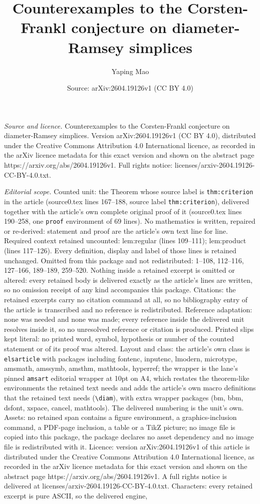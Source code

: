 \documentclass[10pt,a4paper]{amsart}
\title[Counterexamples to the Corsten-Frankl conjecture on diameter]{Counterexamples to the Corsten-Frankl conjecture on diameter-Ramsey simplices}
\author{Yaping Mao}
\date{Source: arXiv:2604.19126v1 (CC BY 4.0)}
\begin{document}
\maketitle

\noindent\emph{Source and licence.} Counterexamples to the Corsten-Frankl conjecture on diameter-Ramsey simplices. Version arXiv:2604.19126v1 (CC BY 4.0), distributed under the Creative Commons Attribution 4.0 International licence, as recorded in the arXiv licence metadata for this exact version and shown on the abstract page https://arxiv.org/abs/2604.19126v1. Full rights notice: licenses/arxiv-2604.19126-CC-BY-4.0.txt.\par\smallskip

\noindent\textit{Editorial scope.} Counted unit: the Theorem whose source label is \texttt{thm:criterion} in the article (source0.tex lines 167--188, source label \texttt{thm:criterion}), delivered together with the article's own complete original proof of it (source0.tex lines 190--258, one \texttt{proof} environment of 69 lines). No mathematics is written, repaired or re-derived: statement and proof are the article's own text line for line. Required context retained uncounted: lem:regular (lines 109--111); lem:product (lines 117--126). Every definition, display and label of those lines is retained unchanged. Omitted from this package and not redistributed: 1--108, 112--116, 127--166, 189--189, 259--520. Nothing inside a retained excerpt is omitted or altered: every retained body is delivered exactly as the article's lines are written, so no omission receipt of any kind accompanies this package. Citations: the retained excerpts carry no citation command at all, so no bibliography entry of the article is transcribed and no reference is redistributed. Reference adaptation: none was needed and none was made; every reference inside the delivered unit resolves inside it, so no unresolved reference or citation is produced. Printed slips kept literal: no printed word, symbol, hypothesis or number of the counted statement or of its proof was altered. Layout and class: the article's own class is \texttt{elsarticle} with packages including fontenc, inputenc, lmodern, microtype, amsmath, amssymb, amsthm, mathtools, hyperref; the wrapper is the lane's pinned \texttt{amsart} editorial wrapper at 10pt on A4, which restates the theorem-like environments the retained text needs and adds the article's own macro definitions that the retained text needs (\texttt{\textbackslash diam}), with extra wrapper packages (bm, bbm, dsfont, xspace, cancel, mathtools). The delivered numbering is the unit's own. Assets: no retained span contains a figure environment, a graphics-inclusion command, a PDF-page inclusion, a table or a TikZ picture; no image file is copied into this package, the package declares no asset dependency and no image file is redistributed with it. Licence: version arXiv:2604.19126v1 of this article is distributed under the Creative Commons Attribution 4.0 International licence, as recorded in the arXiv licence metadata for this exact version and shown on the abstract page https://arxiv.org/abs/2604.19126v1. A full rights notice is delivered at licenses/arxiv-2604.19126-CC-BY-4.0.txt. Characters: every retained excerpt is pure ASCII, so the delivered engine, 
\end{document}
